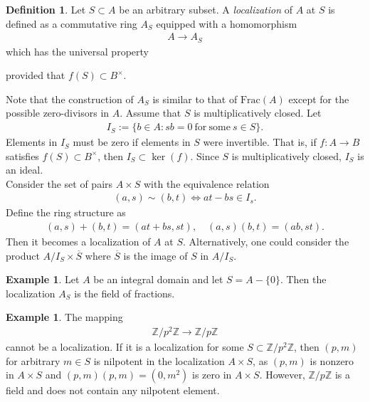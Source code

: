\documentclass[12pt]{report}
\theoremstyle{plain}
\theoremstyle{remark}
\theoremstyle{definition}
\newtheorem{definition}[theorem]{Definition}
\newtheorem{example}[theorem]{Example}
\newcommand{\Z}{\mathbb{Z}}
\begin{document}
\begin{definition}
    Let $S\subset A$ be an arbitrary subset. A \emph{localization} of $A$ at $S$ is defined as a commutative ring $A_S$ equipped with a homomorphism
    \begin{align*}
        A\rightarrow A_S
    \end{align*}
    which has the universal property
    \begin{figure}[H]
        \centering
    \end{figure}
    \noindent
    provided that $f(S)\subset B^\times$.
\end{definition}

Note that the construction of $A_S$ is similar to that of $\mathrm{Frac}(A)$ except for the possible zero-divisors in $A$. Assume that $S$ is multiplicatively closed. Let
\begin{align*}
    I_S:=\{b\in A:sb=0\mathrm{~for~some~}s\in S\}.
\end{align*}
Elements in $I_S$ must be zero if elements in $S$ were invertible. That is, if $f:A\rightarrow B$ satisfies $f(S)\subset B^\times$, then $I_S\subset \ker (f)$. Since $S$ is multiplicatively closed, $I_S$ is an ideal. \\

Consider the set of pairs $A\times S$ with the equivalence relation
\begin{align*}
    (a,s)\sim (b,t) \iff at-bs\in I_s.
\end{align*}
Define the ring structure as
\begin{align*}
    (a,s)+(b,t)=(at+bs,st),\quad (a,s)(b,t)=(ab,st).
\end{align*}
Then it becomes a localization of $A$ at $S$. Alternatively, one could consider the product $A/I_S\times \overline{S}$ where $\overline{S}$ is the image of $S$ in $A/I_S$.

\begin{example}
    Let $A$ be an integral domain and let $S=A-\{0\}$. Then the localization $A_S$ is the field of fractions.
\end{example}

\begin{example}
    The mapping
    \begin{align*}
        \Z/p^2\Z\rightarrow \Z/p\Z
    \end{align*}
    cannot be a localization. If it is a localization for some $S\subset \Z/p^2\Z$, then $(p,m)$ for arbitrary $m\in S$ is nilpotent in the localization $A\times S$, as $(p,m)$ is nonzero in $A\times S$ and $(p,m)(p,m)=(0,m^2)$ is zero in $A\times S$. However, $\Z/p\Z$ is a field and does not contain any nilpotent element.
\end{example}
\end{document}
